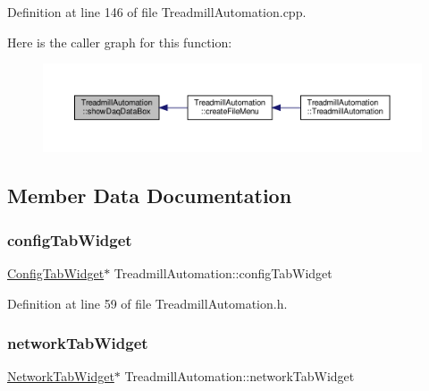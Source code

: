 Definition at line 146 of file Treadmill\+Automation.\+cpp.

Here is the caller graph for this function\+:
\nopagebreak
\begin{figure}[H]
\begin{center}
\leavevmode
\includegraphics[width=350pt]{class_treadmill_automation_a2c95c71e2ab52800e415565c9f59838c_icgraph}
\end{center}
\end{figure}


\subsection{Member Data Documentation}
\mbox{\label{class_treadmill_automation_a887ae170ab2e69444dae729b386c6cbd}} 
\subsubsection{\texorpdfstring{config\+Tab\+Widget}{configTabWidget}}
{\footnotesize\ttfamily \hyperlink{class_config_tab_widget}{Config\+Tab\+Widget}$\ast$ Treadmill\+Automation\+::config\+Tab\+Widget}



Definition at line 59 of file Treadmill\+Automation.\+h.

\mbox{\label{class_treadmill_automation_ac455b94138887ae341d14f5f208212a1}} 
\subsubsection{\texorpdfstring{network\+Tab\+Widget}{networkTabWidget}}
{\footnotesize\ttfamily \hyperlink{class_network_tab_widget}{Network\+Tab\+Widget}$\ast$ Treadmill\+Automation\+::network\+Tab\+Widget}



